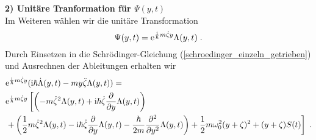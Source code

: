       \textbf{2) Unitäre Tranformation für $\Psi(y,t)$}\\
      Im Weiteren wählen wir die unitäre Transformation
      \begin{equation}
        \Psi(y,t) = \text e^{\frac{\text i}{\hbar}m\dot \zeta y}\Lambda(y,t) \; .
      \end{equation}
      Durch Einsetzen in die Schrödinger-Gleichung (\ref{schroedinger_einzeln_getrieben}) und Ausrechnen der Ableitungen erhalten wir
      \begin{align}
        \begin{split}
          &\text e^{\frac{\text i}{\hbar}m\dot \zeta y}(\text i \hbar \dot \Lambda(y,t) - my \ddot{\zeta}\Lambda(y,t)) =\\
           &\text e^{\frac{\text i}{\hbar}m\dot \zeta y} \left[\left(-m\dot \zeta^2 \Lambda(y,t) + \text i \hbar \dot \zeta \frac{\partial}{\partial y} \Lambda(y,t) \right) \right. \\
           &\left. + \left(\frac{1}{2}m\dot \zeta^2 \Lambda(y,t) - \text{i} \hbar \dot \zeta \frac{\partial}{\partial y} \Lambda(y,t) - \frac{\hbar}{2m}\frac{\partial^2}{\partial y^2} \Lambda(y,t)  \right)
          + \frac{1}{2}m\omega_0^2(y+\zeta)^2  + (y+\zeta)S(t)  \right] \; .
        \end{split}
      \end{align}
      \iffalse
      Durch Einsetzen in die Schrödinger-Gleichung und Ausrechnen der Ableitungen erhalten wir für die linke Seite von (\ref{schroedinger_einzeln_getrieben})
      \text e^{\frac{\text i}{\hbar}m\dot \zeta y}(\text i \hbar \dot \Lambda(y,t) - my \ddot{\zeta}\Lambda(y,t))
      \begin{equation}
      \end{equation}
      und für die rechte Seite
      \begin{align}
        \begin{split}
        \text e^{\frac{\text i}{\hbar}m\dot \zeta y} \left[\left(-m\dot \zeta^2 \Lambda(y,t) + \text i \hbar \dot \zeta \frac{\partial}{\partial y} \Lambda(y,t) \right) + \left(\frac{1}{2}m\dot \zeta^2 \Lambda(y,t) - \text{i} \hbar \dot \zeta \frac{\partial}{\partial y} \Lambda(y,t) - \frac{\hbar}{2m}\frac{\partial^2}{\partial y^2} \Lambda(y,t)  \right) \right. \\
        \left. + \left(\frac{1}{2}m\omega_0^2y^2\Lambda(y,t) + m\omega_0^2y\zeta\Lambda(y,t) + \frac{1}{2}m\omega_0^2 \zeta^2\Lambda(y,t)) \right) + \left(-yS(t)\Lambda(y,t) - \zeta S(t)\Lambda(y,t) \right) \right]
      \end{split}
      \end{align}
      \fi

